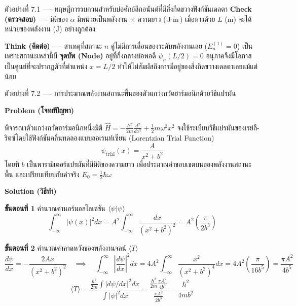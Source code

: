 \begin{psctbox}{ตัวอย่างที่ 7.1 ---- ทฤษฎีการรบกวนสำหรับบ่อศักย์ลึกอนันต์ที่มีสิ่งกีดขวางฟังก์ชันเดลตา}
\textbf{Check (ตรวจสอบ)} ---- มิติของ $\alpha$ มีหน่วยเป็นพลังงาน $\times$ ความยาว ($\text{J}\cdot\text{m}$) เมื่อหารด้วย $L$ ($\text{m}$) จะได้หน่วยของพลังงาน ($\text{J}$) อย่างถูกต้อง

\textbf{Think (คิดต่อ)} ---- สาเหตุที่สถานะ $n$ คู่ไม่มีการเลื่อนของระดับพลังงานเลย ($E_n^{(1)} = 0$) เป็นเพราะสถานะเหล่านี้มี \textbf{จุดบัพ (Node)} อยู่ที่กึ่งกลางบ่อพอดี $\psi_n(L/2) = 0$ อนุภาคจึงมีโอกาสเป็นศูนย์ที่จะปรากฏตัวที่ตำแหน่ง $x = L/2$ ทำให้ไม่สัมผัสถึงการมีอยู่ของสิ่งกีดขวางเดลตาเลยแม้แต่น้อย
\end{psctbox}

\begin{psctbox}{ตัวอย่างที่ 7.2 ---- การประมาณพลังงานสถานะพื้นของตัวแกว่งกวัดฮาร์มอนิกด้วยวิธีแปรผัน}

\textbf{Problem (โจทย์ปัญหา)}

พิจารณาตัวแกว่งกวัดฮาร์มอนิกหนึ่งมิติ $\hat{H} = -\frac{\hbar^2}{2m}\frac{d^2}{dx^2} + \frac{1}{2}m\omega^2 x^2$ จงใช้ระเบียบวิธีแปรผันของเรย์ลี-ริตซ์โดยใช้ฟังก์ชันคลื่นทดลองแบบลอเรนท์เซียน (Lorentzian Trial Function)
\begin{equation*}
\psi_{\text{trial}}(x) = \frac{A}{x^2 + b^2}
\end{equation*}
โดยที่ $b$ เป็นพารามิเตอร์แปรผันที่มีมิติของความยาว เพื่อประมาณค่าขอบเขตบนของพลังงานสถานะพื้น และเปรียบเทียบกับค่าจริง $E_0 = \frac{1}{2}\hbar\omega$

\textbf{Solution (วิธีทำ)}

\textbf{ขั้นตอนที่ 1} คำนวณค่านอร์มอลไลเซชัน $\braket{\psi}{\psi}$
\begin{equation*}
\int_{-\infty}^\infty |\psi(x)|^2 dx = A^2 \int_{-\infty}^\infty \frac{dx}{(x^2 + b^2)^2} = A^2 \left( \frac{\pi}{2 b^3} \right)
\end{equation*}

\textbf{ขั้นตอนที่ 2} คำนวณค่าคาดหวังของพลังงานจลน์ $\langle T \rangle$
\begin{equation*}
\frac{d\psi}{dx} = -\frac{2Ax}{(x^2 + b^2)^2} \quad \implies \quad \int_{-\infty}^\infty \left|\frac{d\psi}{dx}\right|^2 dx = 4A^2 \int_{-\infty}^\infty \frac{x^2}{(x^2 + b^2)^4} dx = 4A^2 \left( \frac{\pi}{16 b^5} \right) = \frac{\pi A^2}{4 b^5}
\end{equation*}
\begin{equation*}
\langle T \rangle = \frac{\frac{\hbar^2}{2m}\int |d\psi/dx|^2 dx}{\int |\psi|^2 dx} = \frac{\frac{\hbar^2}{2m} \frac{\pi A^2}{4 b^5}}{\frac{\pi A^2}{2 b^3}} = \frac{\hbar^2}{4m b^2}
\end{equation*}


\end{psctbox}
